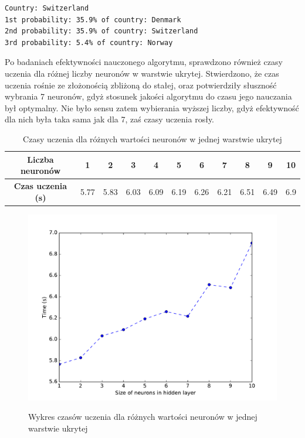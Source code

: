 \begin{lstlisting}[caption=Przykładowy rozkład pewności klas dla niepoprawnego wskazania Szwajcarii]
Country: Switzerland
1st probability: 35.9% of country: Denmark
2nd probability: 35.9% of country: Switzerland
3rd probability: 5.4% of country: Norway
\end{lstlisting}

Po badaniach efektywności nauczonego algorytmu, sprawdzono również czasy uczenia dla różnej liczby neuronów w warstwie ukrytej. Stwierdzono, że czas uczenia rośnie ze złożonością zbliżoną do stałej, oraz potwierdziły słuszność wybrania 7 neuronów, gdyż stosunek jakości algorytmu do czasu jego nauczania był optymalny. Nie było sensu zatem wybierania wyższej liczby, gdyż efektywność dla nich była taka sama jak dla 7, zaś czasy uczenia rosły.

\begin{table}[ht!]
\centering
\caption{Czasy uczenia dla różnych wartości neuronów w jednej warstwie ukrytej}
\label{times}
\begin{tabular}{@{}|c|c|c|c|c|c|c|c|c|c|c|@{}}
\toprule
\textbf{Liczba neuronów}  & 1    & 2    & 3    & 4    & 5    & 6    & 7    & 8    & 9    & 10  \\ \midrule
\textbf{Czas uczenia (s)} & 5.77 & 5.83 & 6.03 & 6.09 & 6.19 & 6.26 & 6.21 & 6.51 & 6.49 & 6.9 \\ \bottomrule
\end{tabular}
\end{table}

\newpage

\begin{figure}[h!]
	\centering
	\includegraphics[width=0.90\linewidth]{times.pdf}
	\label{features}
	\caption{Wykres czasów uczenia dla różnych wartości neuronów w jednej warstwie ukrytej}
\end{figure}

